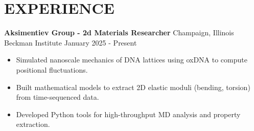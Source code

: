 \documentclass[a4paper,12pt]{extarticle}
\begin{document}
\section*{EXPERIENCE}

\noindent
\textbf{Aksimentiev Group - 2d Materials Researcher}
\hfill Champaign, Illinois \\
Beckman Institute \hfill January 2025 - Present 

\begin{itemize}[topsep=0pt]
\itemindent=-13pt


\item Simulated nanoscale mechanics of DNA lattices using oxDNA to compute positional fluctuations.

\item Built mathematical models to extract 2D elastic moduli (bending, torsion) from time-sequenced data.

\item Developed Python tools for high-throughput MD analysis and property extraction.
\end{itemize}
\end{document}
